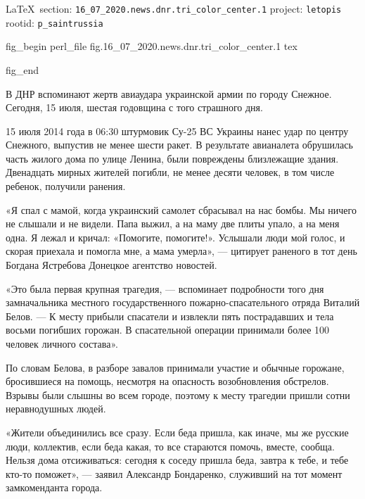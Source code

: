 \documentclass[a4paper,11pt]{extreport}
\begin{document}
\vspace{0.5cm}
{\ifDEBUG\small\LaTeX~section: \verb|16_07_2020.news.dnr.tri_color_center.1| project: \verb|letopis| rootid: \verb|p_saintrussia|\fi}
\vspace{0.5cm}

 
 
 
\ifcmt
fig_begin
	perl_file fig.16_07_2020.news.dnr.tri_color_center.1
	tex \caption{\sectitle}
fig_end
\fi


В ДНР вспоминают жертв авиаудара украинской армии по городу Снежное. Сегодня,
15 июля, шестая годовщина с того страшного дня.

15 июля 2014 года в 06:30 штурмовик Су-25 ВС Украины нанес удар по центру
Снежного, выпустив не менее шести ракет. В результате авианалета обрушилась
часть жилого дома по улице Ленина, были повреждены близлежащие здания.
Двенадцать мирных жителей погибли, не менее десяти человек, в том числе
ребенок, получили ранения.

«Я спал с мамой, когда украинский самолет сбрасывал на нас бомбы. Мы ничего не
слышали и не видели. Папа выжил, а на маму две плиты упало, а на меня одна. Я
лежал и кричал: «Помогите, помогите!». Услышали люди мой голос, и скорая
приехала и помогла мне, а мама умерла», --- цитирует раненого в тот день Богдана
Ястребова Донецкое агентство новостей.

«Это была первая крупная трагедия, --- вспоминает подробности того дня
замначальника местного государственного пожарно-спасательного отряда Виталий
Белов. --- К месту прибыли спасатели и извлекли пять пострадавших и тела восьми
погибших горожан. В спасательной операции принимали более 100 человек личного
состава».

По словам Белова, в разборе завалов принимали участие и обычные горожане,
бросившиеся на помощь, несмотря на опасность возобновления обстрелов. Взрывы
были слышны во всем городе, поэтому к месту трагедии пришли сотни неравнодушных
людей.

«Жители объединились все сразу. Если беда пришла, как иначе, мы же русские
люди, коллектив, если беда какая, то все стараются помочь, вместе, сообща.
Нельзя дома отсиживаться: сегодня к соседу пришла беда, завтра к тебе, и тебе
кто-то поможет», --- заявил Александр Бондаренко, служивший на тот момент
замкоменданта города.
\end{document}
